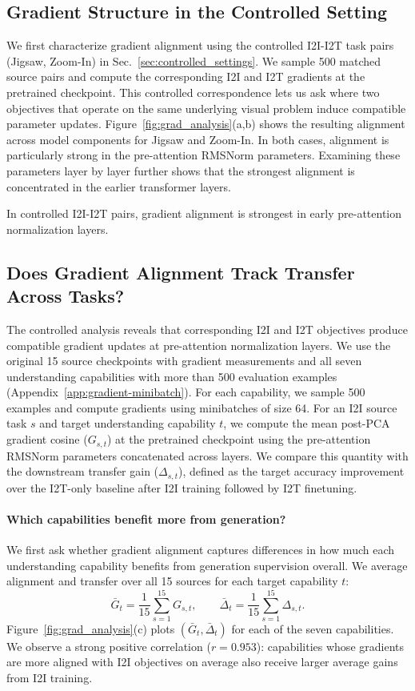 \subsection{Gradient Structure in the Controlled Setting}
We first characterize gradient alignment using the controlled I2I-I2T task pairs (Jigsaw, Zoom-In) in Sec.~\ref{sec:controlled_settings}.
We sample 500 matched source pairs and compute the corresponding I2I and I2T gradients at the pretrained checkpoint. 
This controlled correspondence lets us ask where two objectives that operate on the same underlying visual problem induce compatible parameter updates.
Figure~\ref{fig:grad_analysis}(a,b) shows the resulting alignment across model components for Jigsaw and Zoom-In. 
In both cases, alignment is particularly strong in the pre-attention RMSNorm parameters. 
Examining these parameters layer by layer further shows that the strongest alignment is concentrated in the earlier transformer layers.
\begin{findingbox}
In controlled I2I-I2T pairs, gradient alignment is strongest in early pre-attention normalization layers.
\end{findingbox}
\subsection{Does Gradient Alignment Track Transfer Across Tasks?}
The controlled analysis reveals that corresponding I2I and I2T objectives produce compatible gradient updates at pre-attention normalization layers.
We use the original 15 source checkpoints with gradient measurements and all seven understanding capabilities with more than 500 evaluation examples (Appendix~\ref{app:gradient-minibatch}).
For each capability, we sample 500 examples and compute gradients using minibatches of size 64.
For an I2I source task $s$ and target understanding capability $t$, we compute the mean post-PCA gradient cosine ($G_{s,t}$) at the pretrained checkpoint using the pre-attention RMSNorm parameters concatenated across layers.
We compare this quantity with the downstream transfer gain
($\Delta_{s,t}$), defined as the target accuracy improvement over the I2T-only baseline after I2I training followed by I2T finetuning.
\paragraph{Which capabilities benefit more from generation?}
We first ask whether gradient alignment captures differences in how much each understanding capability benefits from generation supervision overall.
We average alignment and transfer over all 15 sources for each target capability \(t\):
$$
\bar{G}_t=\frac{1}{15}\sum_{s=1}^{15}G_{s,t},
\qquad
\bar{\Delta}_t=\frac{1}{15}\sum_{s=1}^{15}\Delta_{s,t}.
$$
Figure~\ref{fig:grad_analysis}(c) plots \((\bar{G}_t,\bar{\Delta}_t)\) for each of the seven capabilities.
We observe a strong positive correlation (\(r=0.953\)): capabilities whose gradients are more aligned with I2I objectives on average also receive larger average gains from I2I training.
